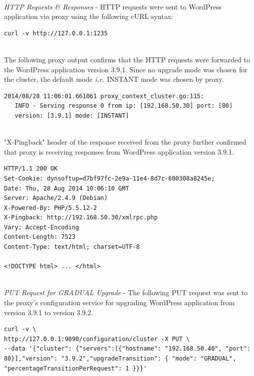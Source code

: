\documentclass[a4paper,11pt,twoside]{report}
\begin{document}
\noindent\\
\textit{HTTP Requests \& Responses} - HTTP requests were sent to WordPress application via proxy using the following cURL syntax:\smallskip

\begin{lstlisting}[language=terminal]
curl -v http://127.0.0.1:1235
\end{lstlisting}

\noindent\\
The following proxy output confirms that the HTTP requests were forwarded to the WordPress application version 3.9.1. Since no upgrade mode was chosen for the cluster, the default mode \textit{i.e.} INSTANT mode was chosen by proxy. \smallskip

\begin{lstlisting}[language=terminal]
2014/08/28 11:06:01.661061 proxy_context_cluster.go:115:     
   INFO - Serving response 0 from ip: [192.168.50.30] port: [80] 
   version: [3.9.1] mode: [INSTANT]
\end{lstlisting}

\noindent\\
"X-Pingback" header of the response received from the proxy further confirmed that proxy is receiving responses from WordPress application version 3.9.1.\smallskip 

\begin{lstlisting}[language=terminal]
HTTP/1.1 200 OK
Set-Cookie: dynsoftup=d7bf97fc-2e9a-11e4-8d7c-600308a8245e;
Date: Thu, 28 Aug 2014 10:06:10 GMT
Server: Apache/2.4.9 (Debian)
X-Powered-By: PHP/5.5.12-2
X-Pingback: http://192.168.50.30/xmlrpc.php
Vary: Accept-Encoding
Content-Length: 7523
Content-Type: text/html; charset=UTF-8
 
<!DOCTYPE html> ... </html>
\end{lstlisting}

\noindent\\
\textit{PUT Request for GRADUAL Upgrade} - The following PUT request was sent to the proxy's configuration service for upgrading WordPress application from version 3.9.1 to version 3.9.2.\smallskip

\begin{lstlisting}[language=terminal]
curl -v \
http://127.0.0.1:9090/configuration/cluster -X PUT \
--data '{"cluster": {"servers":[{"hostname": "192.168.50.40", "port": 80}],"version": "3.9.2","upgradeTransition": { "mode": "GRADUAL", "percentageTransitionPerRequest": 1 }}}'
\end{lstlisting}
 
\end{document}
